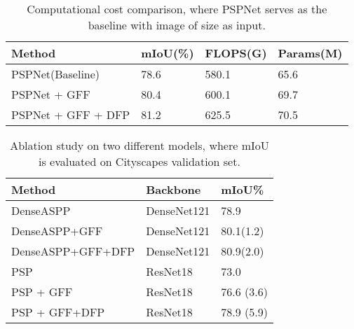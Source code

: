 \documentclass[letterpaper]{article} \usepackage{aaai20}  \usepackage{times}  \usepackage{helvet} \usepackage{courier}  \usepackage[hyphens]{url}  \usepackage{graphicx} \urlstyle{rm} \def\UrlFont{\rm}  \usepackage{graphicx}  \usepackage{amsmath}
\begin{document}
\begin{table}[!t]
    \centering
    \footnotesize
    \setlength{\tabcolsep}{3.4 pt}
    \begin{tabular}{l|l|l|l}
    \hline
    Method & mIoU(\%) & FLOPS(G) & Params(M) \\
    \hline
    PSPNet(Baseline) & 78.6 & 580.1 & 65.6\\
    \hline
    PSPNet + GFF & 80.4 & 600.1 & 69.7 \\
    \hline
    PSPNet + GFF + DFP & 81.2 &  625.5 & 70.5\\ 
    \hline
    \end{tabular}
     \caption{Computational cost comparison, where PSPNet serves as the baseline with image of size  as input.}
     \label{tab:GFlops}
\end{table}


	\begin{table}[!t]
		\centering
		\footnotesize
		\begin{tabular}{l|l|l}
			\hline
			Method &  Backbone & mIoU\% \\
			\hline
			DenseASPP & DenseNet121 & 78.9 \\
			DenseASPP+GFF & DenseNet121 & 80.1(1.2) \\
			DenseASPP+GFF+DFP & DenseNet121 & 80.9(2.0) \\
			\hline
            PSP & ResNet18 &  73.0 \\
            PSP + GFF & ResNet18 & 76.6 (3.6)\\
            PSP + GFF+DFP & ResNet18 & 78.9 (5.9) \\
			\hline
		\end{tabular}
		\caption{Ablation study on two different models, where mIoU is evaluated on Cityscapes validation set.}
		\label{tab:more_bases}
	\end{table}
\end{document}
